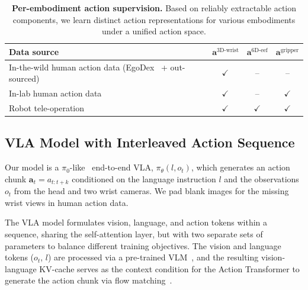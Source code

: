 \begin{table}[htbp]
\caption{
    \textbf{Per-embodiment action supervision.}
    Based on reliably extractable action components, we learn distinct action representations for various embodiments under a unified action space.
}
\label{method:tab:supervision}
\centering
\small
\begin{tabular}{l|ccc}
\toprule
Data source & $\mathbf{a}^{\text{3D-wrist}}$ & $\mathbf{a}^{\text{6D-eef}}$ & $\mathbf{a}^{\text{gripper}}$ \\
\midrule
In-the-wild human action data (EgoDex~\cite{hoque2025egodex} + out-sourced) & $\checkmark$ & --           & --           \\
In-lab human action data & $\checkmark$ & --           & $\checkmark$ \\
Robot tele-operation                     & $\checkmark$ & $\checkmark$ & $\checkmark$ \\
\bottomrule
\end{tabular}
\end{table}





\subsection{VLA Model with Interleaved Action Sequence}
\label{sec:model:model}


%
Our model is a $\pi_0$-like~\cite{black2024pi_0,cheang2025gr3} end-to-end VLA, $\pi_\theta(l, o_t)$, which generates an action chunk $\mathbf{a}_t = a_{t:t+k}$ conditioned on the language instruction $l$ and the observations $o_t$ from the head and two wrist cameras.
% 
We pad blank images for the missing wrist views in human action data.



The VLA model formulates vision, language, and action tokens within a sequence, sharing the self-attention layer, but with two separate sets of parameters to balance different training objectives.
% 
The vision and language tokens ($o_t$, $l$) are processed via a pre-trained VLM~\cite{bai2025qwen25vltechnicalreport}, and the resulting vision-language KV-cache serves as the context condition for the Action Transformer to generate the action chunk via flow matching~\cite{liu2022flow,lipman2022flow}.






